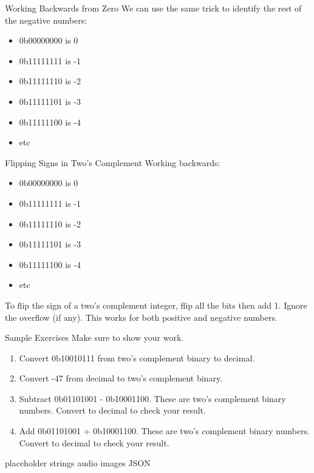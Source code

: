 \begin{frame}{Working Backwards from Zero}
    We can use the same trick to identify the rest of the negative numbers:
        \begin{itemize}
        \item 0b00000000 is 0
        \item 0b11111111 is -1
        \item 0b11111110 is -2
        \item 0b11111101 is -3
        \item 0b11111100 is -4
        \item etc
    \end{itemize}
        \end{frame}

\begin{frame}{Flipping Signs in Two's Complement}
    Working backwards:
        \begin{itemize}
        \item 0b00000000 is 0
        \item 0b11111111 is -1
        \item 0b11111110 is -2
        \item 0b11111101 is -3
        \item 0b11111100 is -4
        \item etc
    \end{itemize}
    
    To flip the sign of a two's complement integer, flip all the bits then add 1. Ignore the overflow (if any). This works for both positive and negative numbers. 
    \end{frame}
    
\begin{frame}{Sample Exercises}
Make sure to show your work.
\begin{enumerate}
    \item Convert 0b10010111 from two's complement binary to decimal.
    \item Convert -47 from decimal to two's complement binary. 
    \item Subtract 0b01101001 - 0b10001100. These are two's complement binary numbers. Convert to decimal to check your result.
    \item Add 0b01101001 + 0b10001100. These are two's complement binary numbers. Convert to decimal to check your result.
\end{enumerate}
\end{frame}




\begin{frame}{placeholder}
    strings
    audio
    images
    JSON
\end{frame}
    
